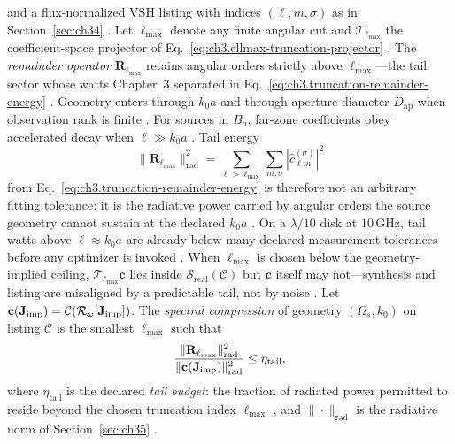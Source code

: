and a flux-normalized VSH listing with indices \((\ell,m,\sigma)\) as in Section~\ref{sec:ch34}
\cite{stratton1941}. Let \(\ell_{\max}\) denote any finite angular cut and
\(\mathcal{T}_{\ell_{\max}}\) the coefficient-space projector of
Eq.~\eqref{eq:ch3.ellmax-truncation-projector} \cite{harrington2001}. The \emph{remainder operator} \(\mathbf{R}_{\ell_{\max}}\) retains angular orders strictly above \(\ell_{\max}\)---the tail sector whose watts Chapter~3 separated in Eq.~\eqref{eq:ch3.truncation-remainder-energy} \cite{hansen1988}. Geometry enters through
\(k_{0}a\) and through aperture diameter \(D_{\mathrm{ap}}\) when observation rank is finite
\cite{jackson1999}.
For sources in \(B_{a}\), far-zone coefficients obey accelerated decay when \(\ell\gg k_{0}a\)
\cite{stratton1941}. Tail energy
\begin{equation}
\label{eq:ch4.spectral-tail-energy}
\|\mathbf{R}_{\ell_{\max}}\|_{\mathrm{rad}}^{2}
=
\sum_{\ell>\ell_{\max}}\sum_{m,\sigma}|\widehat{c}_{\ell m}^{(\sigma)}|^{2}
\end{equation}
from Eq.~\eqref{eq:ch3.truncation-remainder-energy} is therefore not an arbitrary fitting tolerance:
it is the radiative power carried by angular orders the source geometry cannot sustain at the declared
\(k_{0}a\) \cite{hansen1988}. On a $\lambda/10$ disk at $10\,\mathrm{GHz}$, tail watts above $\ell\approx k_0 a$ are already below many declared measurement tolerances before any optimizer is invoked \cite{chu1948}. When \(\ell_{\max}\) is chosen below the geometry-implied
ceiling, \(\mathcal{T}_{\ell_{\max}}\mathbf{c}\) lies inside \(\mathcal{S}_{\mathrm{real}}(\mathcal{C})\) but
\(\mathbf{c}\) itself may not---synthesis and listing are misaligned by a predictable tail, not by noise
\cite{stratton1941}.
\label{def:ch4.spectral-compression}
Let \(\mathbf{c}(\mathbf{J}_{\mathrm{imp}})=\mathcal{C}(\mathcal{R}_\omega[\mathbf{J}_{\mathrm{imp}}])\). The \emph{spectral compression} of
geometry \((\Omega_{s},k_{0})\) on listing \(\mathcal{C}\) is the smallest \(\ell_{\max}\) such that
\begin{equation}
\label{eq:ch4.spectral-compression-def}
\frac{\|\mathbf{R}_{\ell_{\max}}\|_{\mathrm{rad}}^{2}}{\|\mathbf{c}(\mathbf{J}_{\mathrm{imp}})\|_{\mathrm{rad}}^{2}}
\le \eta_{\mathrm{tail}},
\end{equation}
where \(\eta_{\mathrm{tail}}\) is the declared \emph{tail budget}: the fraction of radiated power permitted to reside beyond the chosen truncation index \(\ell_{\max}\) \cite{hansen1988}, and \(\|\cdot\|_{\mathrm{rad}}\) is the radiative
norm of Section~\ref{sec:ch35} \cite{harrington2001}.
